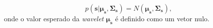 \begin{equation}
p(\boldsymbol{s}|\boldsymbol{\mu_{s}},\boldsymbol{\Sigma_{s}}) =
N(\boldsymbol{\mu_{s}},\boldsymbol{\Sigma_{s}}),
\end{equation} 
onde o valor esperado da \textit{wavelet} $\boldsymbol{\mu_{s}}$ é definido
como um vetor nulo.
% 
% 
% 
% 
